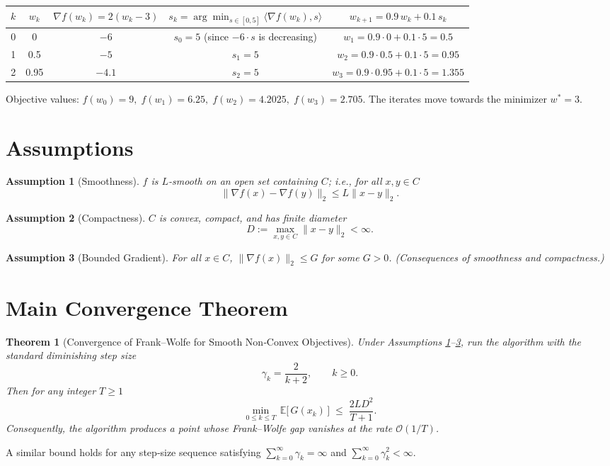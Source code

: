 \documentclass{article}
\newtheorem{theorem}{Theorem}
\newtheorem{assumption}{Assumption}
\begin{document}
\begin{center}
\begin{tabular}{c|c|c|c|c}
\(k\) & \(w_{k}\) & \(\nabla f(w_{k})=2(w_{k}-3)\) & \(s_{k}=\arg\min_{s\in[0,5]}\langle\nabla f(w_{k}),s\rangle\) & \(w_{k+1}=0.9\,w_{k}+0.1\,s_{k}\)\\\hline
0 & 0 & \(-6\) & \(s_{0}=5\) (since \(-6\cdot s\) is decreasing) & \(w_{1}=0.9\cdot0+0.1\cdot5=0.5\)\\[2pt]
1 & 0.5 & \(-5\) & \(s_{1}=5\) & \(w_{2}=0.9\cdot0.5+0.1\cdot5=0.95\)\\[2pt]
2 & 0.95 & \(-4.1\) & \(s_{2}=5\) & \(w_{3}=0.9\cdot0.95+0.1\cdot5=1.355\)
\end{tabular}
\end{center}
Objective values: \(f(w_{0})=9,\;f(w_{1})=6.25,\;f(w_{2})=4.2025,\;f(w_{3})=2.705\).  
The iterates move towards the minimizer \(w^{*}=3\).

\newpage
\section*{Assumptions}
\begin{assumption}[Smoothness]\label{ass:smooth}
\(f\) is \(L\)-smooth on an open set containing \(C\); i.e., for all \(x,y\in C\)
\[
\|\nabla f(x)-\nabla f(y)\|_{2}\le L\|x-y\|_{2}.
\tag{3}
\]
\end{assumption}
\begin{assumption}[Compactness]\label{ass:compact}
\(C\) is convex, compact, and has finite diameter
\[
D:=\max_{x,y\in C}\|x-y\|_{2}<\infty .
\tag{4}
\]
\end{assumption}
\begin{assumption}[Bounded Gradient]\label{ass:gradbound}
For all \(x\in C\), \(\|\nabla f(x)\|_{2}\le G\) for some \(G>0\).  
(Consequences of smoothness and compactness.)
\end{assumption}

\section*{Main Convergence Theorem}
\begin{theorem}[Convergence of Frank–Wolfe for Smooth Non‑Convex Objectives]\label{thm:main}
Under Assumptions \ref{ass:smooth}–\ref{ass:gradbound}, run the algorithm with the
\emph{standard diminishing step size}
\[
\gamma_{k}= \frac{2}{k+2},\qquad k\ge0 .
\tag{5}
\]
Then for any integer \(T\ge1\)
\[
\min_{0\le k\le T}\, \mathbb{E}\bigl[\,G(x_{k})\,\bigr]
\;\le\;
\frac{2L D^{2}}{T+1}.
\tag{6}
\]
Consequently, the algorithm produces a point whose Frank–Wolfe gap
vanishes at the rate \(\mathcal{O}(1/T)\).
\end{theorem}
A similar bound holds for any step‑size sequence satisfying
\(\sum_{k=0}^{\infty}\gamma_{k}= \infty\) and \(\sum_{k=0}^{\infty}\gamma_{k}^{2}<\infty\).
\end{document}
